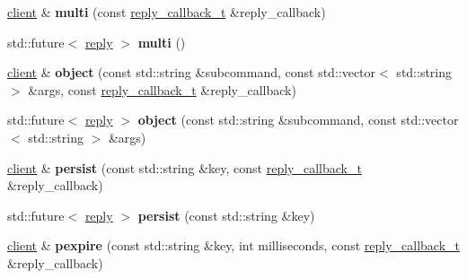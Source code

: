\begin{DoxyCompactItemize}
\item 
\mbox{\label{classcpp__redis_1_1client_af760234ec07174ae23d223c14df4e1bb}} 
\hyperlink{classcpp__redis_1_1client}{client} \& {\bfseries multi} (const \hyperlink{classcpp__redis_1_1client_a061a1140d36d2eaeda82b09a0bb3f9f2}{reply\+\_\+callback\+\_\+t} \&reply\+\_\+callback)
\item 
\mbox{\label{classcpp__redis_1_1client_afceccda0873f1a9a7c2bc795e31c8126}} 
std\+::future$<$ \hyperlink{classcpp__redis_1_1reply}{reply} $>$ {\bfseries multi} ()
\item 
\mbox{\label{classcpp__redis_1_1client_a950c545c23746a852476ec6939d6f6a5}} 
\hyperlink{classcpp__redis_1_1client}{client} \& {\bfseries object} (const std\+::string \&subcommand, const std\+::vector$<$ std\+::string $>$ \&args, const \hyperlink{classcpp__redis_1_1client_a061a1140d36d2eaeda82b09a0bb3f9f2}{reply\+\_\+callback\+\_\+t} \&reply\+\_\+callback)
\item 
\mbox{\label{classcpp__redis_1_1client_a6f6c1e715660f270030fd16d7d2d08bd}} 
std\+::future$<$ \hyperlink{classcpp__redis_1_1reply}{reply} $>$ {\bfseries object} (const std\+::string \&subcommand, const std\+::vector$<$ std\+::string $>$ \&args)
\item 
\mbox{\label{classcpp__redis_1_1client_a195c2b896ac8e15c22446a235bf302d4}} 
\hyperlink{classcpp__redis_1_1client}{client} \& {\bfseries persist} (const std\+::string \&key, const \hyperlink{classcpp__redis_1_1client_a061a1140d36d2eaeda82b09a0bb3f9f2}{reply\+\_\+callback\+\_\+t} \&reply\+\_\+callback)
\item 
\mbox{\label{classcpp__redis_1_1client_a9243adf2ff2989cf1cb4de4ce1be1511}} 
std\+::future$<$ \hyperlink{classcpp__redis_1_1reply}{reply} $>$ {\bfseries persist} (const std\+::string \&key)
\item 
\mbox{\label{classcpp__redis_1_1client_a8fc29a500492504985a714d9aaed8963}} 
\hyperlink{classcpp__redis_1_1client}{client} \& {\bfseries pexpire} (const std\+::string \&key, int milliseconds, const \hyperlink{classcpp__redis_1_1client_a061a1140d36d2eaeda82b09a0bb3f9f2}{reply\+\_\+callback\+\_\+t} \&reply\+\_\+callback)

\end{DoxyCompactItemize}
